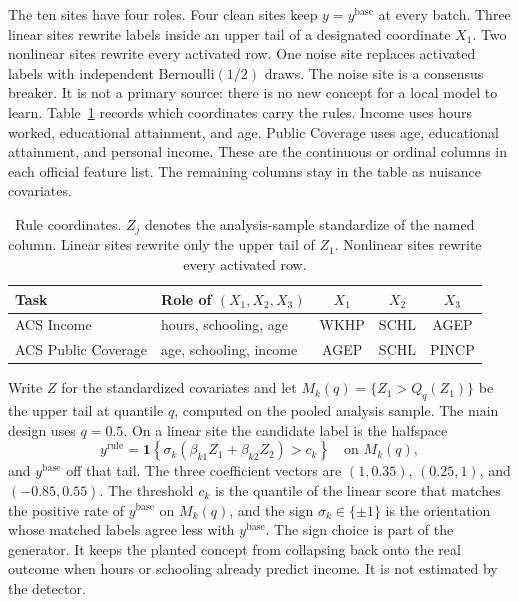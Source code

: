 The ten sites have four roles.
Four clean sites keep $y=y^{\mathrm{base}}$ at every batch.
Three linear sites rewrite labels inside an upper tail of a designated
coordinate $X_1$.
Two nonlinear sites rewrite every activated row.
One noise site replaces activated labels with independent
$\mathrm{Bernoulli}(1/2)$ draws.
The noise site is a consensus breaker.
It is not a primary source: there is no new concept for a local model to
learn.
Table~\ref{tab:roles} records which coordinates carry the rules.
Income uses hours worked, educational attainment, and age.
Public Coverage uses age, educational attainment, and personal income.
These are the continuous or ordinal columns in each official feature list.
The remaining columns stay in the table as nuisance covariates.

\begin{table}[t]
\centering
\caption{Rule coordinates. $Z_j$ denotes the analysis-sample standardize
of the named column. Linear sites rewrite only the upper tail of $Z_1$.
Nonlinear sites rewrite every activated row.}
\label{tab:roles}
\begin{tabular}{llccc}
\toprule
Task & Role of $(X_1,X_2,X_3)$ & $X_1$ & $X_2$ & $X_3$ \\
\midrule
ACS Income & hours, schooling, age & WKHP & SCHL & AGEP \\
ACS Public Coverage & age, schooling, income & AGEP & SCHL & PINCP \\
\bottomrule
\end{tabular}
\end{table}

Write $Z$ for the standardized covariates and let
$M_k(q)=\{Z_1>Q_q(Z_1)\}$ be the upper tail at quantile $q$, computed on
the pooled analysis sample.
The main design uses $q=0.5$.
On a linear site the candidate label is the halfspace
\begin{equation}
\label{eq:linear-rule}
y^{\mathrm{rule}}
=
\mathbf{1}\!\left\{
\sigma_k(\beta_{k1} Z_1+\beta_{k2} Z_2)>c_k
\right\}
\quad\text{on }M_k(q),
\end{equation}
and $y^{\mathrm{base}}$ off that tail.
The three coefficient vectors are
$(1,0.35)$, $(0.25,1)$, and $(-0.85,0.55)$.
The threshold $c_k$ is the quantile of the linear score that matches the
positive rate of $y^{\mathrm{base}}$ on $M_k(q)$, and the sign
$\sigma_k\in\{\pm 1\}$ is the orientation whose matched labels agree less
with $y^{\mathrm{base}}$.
The sign choice is part of the generator.
It keeps the planted concept from collapsing back onto the real outcome
when hours or schooling already predict income.
It is not estimated by the detector.

